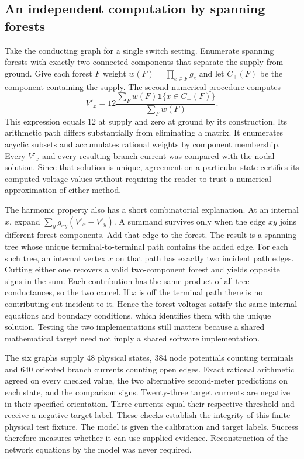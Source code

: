 \documentclass[12pt,letterpaper]{article}
\begin{document}
\subsection{An independent computation by spanning forests}

Take the conducting graph for a single switch setting. Enumerate spanning forests with exactly two connected components that separate the supply from ground. Give each forest $F$ weight $w(F)=\prod_{e\in F}g_e$ and let $C_+(F)$ be the component containing the supply. The second numerical procedure computes
\[
 V'_x=12\frac{\sum_F w(F)\mathbf 1\{x\in C_+(F)\}}
                   {\sum_F w(F)} .
\]
This expression equals 12 at supply and zero at ground by its construction. Its arithmetic path differs substantially from eliminating a matrix. It enumerates acyclic subsets and accumulates rational weights by component membership. Every $V'_x$ and every resulting branch current was compared with the nodal solution. Since that solution is unique, agreement on a particular state certifies its computed voltage values without requiring the reader to trust a numerical approximation of either method.

The harmonic property also has a short combinatorial explanation. At an internal $x$, expand $\sum_y g_{xy}(V'_x-V'_y)$. A summand survives only when the edge $xy$ joins different forest components. Add that edge to the forest. The result is a spanning tree whose unique terminal-to-terminal path contains the added edge. For each such tree, an internal vertex $x$ on that path has exactly two incident path edges. Cutting either one recovers a valid two-component forest and yields opposite signs in the sum. Each contribution has the same product of all tree conductances, so the two cancel. If $x$ is off the terminal path there is no contributing cut incident to it. Hence the forest voltages satisfy the same internal equations and boundary conditions, which identifies them with the unique solution. Testing the two implementations still matters because a shared mathematical target need not imply a shared software implementation.

The six graphs supply 48 physical states, 384 node potentials counting terminals and 640 oriented branch currents counting open edges. Exact rational arithmetic agreed on every checked value, the two alternative second-meter predictions on each state, and the comparison signs. Twenty-three target currents are negative in their specified orientation. Three currents equal their respective threshold and receive a negative target label. These checks establish the integrity of this finite physical test fixture. The model is given the calibration and target labels. Success therefore measures whether it can use supplied evidence. Reconstruction of the network equations by the model was never required.
\end{document}
